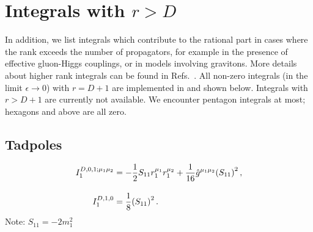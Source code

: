 \section*{Integrals with \boldmath$r>D$}
In addition, we list integrals which contribute to the rational part in cases where the rank exceeds the number of
propagators, for example in the presence of effective gluon-Higgs couplings, or in models involving
gravitons.
More details about higher rank integrals can be found in
Refs.~\cite{Guillet:2013msa,Mastrolia:2012bu,vanDeurzen:2013pja}. All non-zero integrals (in the limit $\epsilon\to0$) with $r=D+1$ are implemented in \gosam and shown below. Integrals with $r>D+1$ are currently not available. We encounter pentagon integrals at most; hexagons and above are all zero.

\subsection*{Tadpoles}
\begin{subequations}
\begin{align}
  I_1^{D,0,1;\mu_1\mu_2} &= -\frac{1}{2}S_{11}r_1^{\mu_1}r_1^{\mu_2}+\frac{1}{16}\hat{g}^{\mu_1\mu_2}\qty(S_{11})^2\,,\\[10pt]
%
  I_1^{D,1,0} &= \frac{1}{8}\qty(S_{11})^2\,.
\end{align}
\end{subequations}
Note: $S_{11}=-2m_1^2$

